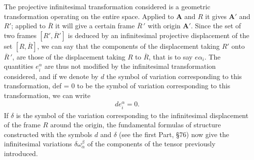 The projective infinitesimal transformation considered is a geometric transformation operating on the entire space. Applied to $\bm A$ and $R$ it gives $\bm A'$ and $R'$; applied to $\overline R$ it will give a certain frame $\overline R\,'$ with origin $\bm A'$. 
%
Since the set of two frames $[R', \overline R']$ is deduced by an infinitesimal projective displacement of the set $[R, \overline R]$, we can say that the components of the displacement taking $R'$ onto $\overline R\,'$, are those of the displacement taking $R$ to $\overline R$, that is to say $e\alpha_i$. 
%
The quantities $e^\alpha_i$ are thus not modified by the infinitesimal transformation considered, and if we denote by $d$ the symbol of variation corresponding to this transformation, def = 0 to be the symbol of variation corresponding to this transformation, we can write
\begin{eqnarray*}
d e^\alpha_i = 0.
\end{eqnarray*}
If $\delta$ is the symbol of the variation corresponding to the infinitesimal displacement of the frame $R$ around the origin, the fundamental formulas of structure constructed with the symbols $d$ and $\delta$ (see the first Part, \S 76) now give the infinitesimal variations $\delta \omega^\beta_\alpha$ of the components of the tensor previously introduced.

